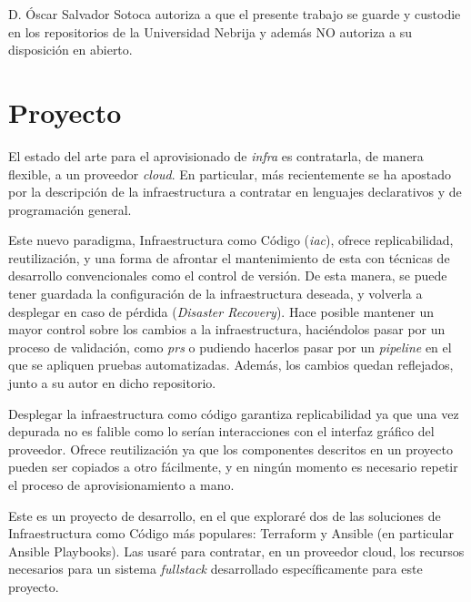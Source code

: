 \documentclass[11pt]{article}
\begin{document}
\begin{flushleft}







\clearpage
D. Óscar Salvador Sotoca autoriza a que el presente trabajo se guarde y custodie en los repositorios de la Universidad Nebrija y además NO autoriza a su disposición en abierto.





\clearpage
\section{Proyecto}
El estado del arte para el aprovisionado de \textit{\gls{infra}} es contratarla, de manera flexible, a un proveedor \textit{\gls{cloud}}. En particular, más recientemente se ha apostado por la descripción de la infraestructura a contratar en lenguajes declarativos y de programación general.
\linebreak

Este nuevo paradigma, Infraestructura como Código (\textit{\acrshort{iac}}), ofrece replicabilidad, reutilización, y una forma de afrontar el mantenimiento de esta con técnicas de desarrollo convencionales como el control de versión. De esta manera, se puede tener guardada la configuración de la infraestructura deseada, y volverla a desplegar en caso de pérdida (\textit{Disaster Recovery}). Hace posible mantener un mayor control sobre los cambios a la infraestructura, haciéndolos pasar por un proceso de validación, como \textit{\acrshort{pr}s} o pudiendo hacerlos pasar por un \textit{\gls{pipeline}} en el que se apliquen pruebas automatizadas. Además, los cambios quedan reflejados, junto a su autor en dicho repositorio.
\linebreak

Desplegar la infraestructura como código garantiza replicabilidad ya que una vez depurada no es falible como lo serían interacciones con el interfaz gráfico del proveedor. Ofrece reutilización ya que los componentes descritos en un proyecto pueden ser copiados a otro fácilmente, y en ningún momento es necesario repetir el proceso de aprovisionamiento a mano.
\linebreak

Este es un proyecto de desarrollo, en el que exploraré dos de las soluciones de Infraestructura como Código más populares: Terraform y Ansible (en particular Ansible Playbooks). Las usaré para contratar, en un proveedor cloud, los recursos necesarios para un sistema \textit{\gls{fullstack}} desarrollado específicamente para este proyecto.
\linebreak


\end{flushleft}
\end{document}

